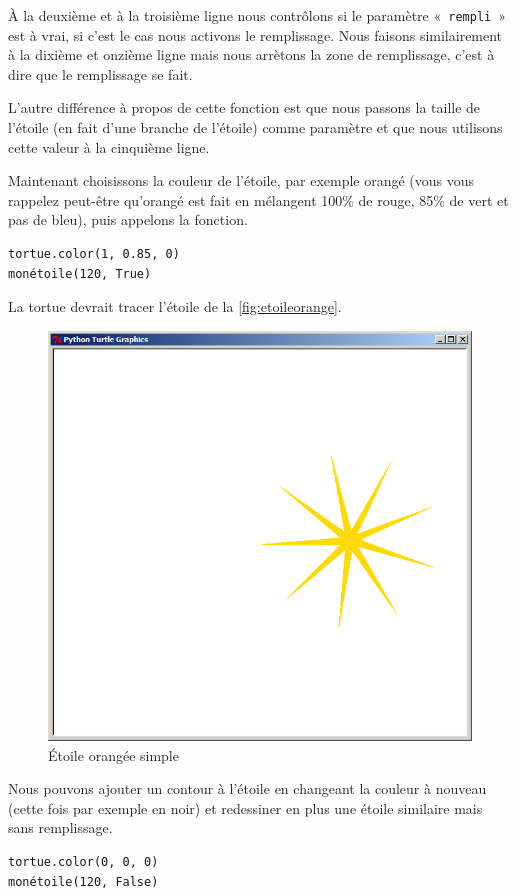 À la deuxième et à la troisième ligne nous contrôlons si le paramètre «~\texttt{rempli}~» est à vrai, si c'est le cas nous activons le remplissage. Nous faisons similairement à la dixième et onzième ligne mais nous arrètons la zone de remplissage, c'est à dire que le remplissage se fait.

L'autre différence à propos de cette fonction est que nous passons la taille de l'étoile (en fait d'une branche de l'étoile) comme paramètre et que nous utilisons cette valeur à la cinquième ligne.

Maintenant choisissons la couleur de l'étoile, par exemple orangé (vous vous rappelez peut-être qu'orangé est fait en mélangent 100\% de rouge, 85\% de vert et pas de bleu), puis appelons la fonction.

\begin{Verbatim}[frame=single,rulecolor=\color{mbleu}, label=à taper]
tortue.color(1, 0.85, 0)
monétoile(120, True)
\end{Verbatim}

La tortue devrait tracer l'étoile de la \autoref{fig:etoileorange}.
\begin{figure}[h!]
\centering
\includegraphics[scale=0.4]{images/etoileorange}
\caption{Étoile orangée simple}\label{fig:etoileorange}
\end{figure}

Nous pouvons ajouter un contour à l'étoile en changeant la couleur à nouveau (cette fois par exemple en noir) et redessiner en plus une étoile similaire mais sans remplissage.
\begin{Verbatim}[frame=single,rulecolor=\color{mbleu}, label=à taper]
tortue.color(0, 0, 0)
monétoile(120, False)
\end{Verbatim}

